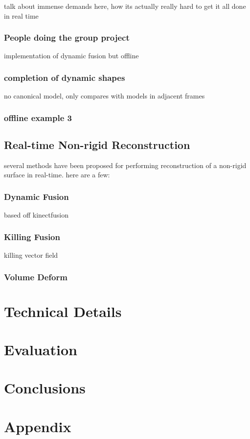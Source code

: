 \documentclass[a4paper]{article}
\begin{document}
talk about immense demands here, how its actually really hard to get it all done in real time

\subsubsection{People doing the group project}

implementation of dynamic fusion but offline

\subsubsection{completion of dynamic shapes}

no canonical model, only compares with models in adjacent frames


\subsubsection{offline example 3}

\subsection{Real-time Non-rigid Reconstruction}

several methods have been proposed for performing reconstruction of a non-rigid surface in real-time.
here are a few:

\subsubsection{Dynamic Fusion}
based off kinectfusion

\subsubsection{Killing Fusion}

killing vector field

\subsubsection{Volume Deform}


\section{Technical Details}

\section{Evaluation}

\section{Conclusions}

\section{Appendix}



\end{document}
